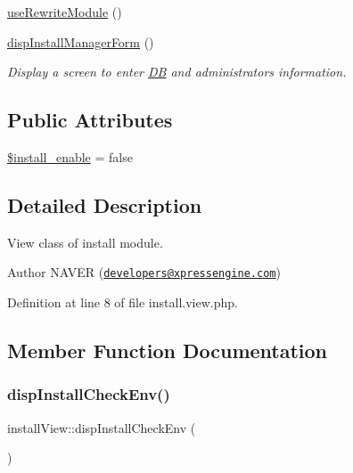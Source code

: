 \begin{DoxyCompactItemize}
\hyperlink{classinstallView_a276997dd4c77a1a1cec5ceed56367ee9}{use\+Rewrite\+Module} ()
\item 
\hyperlink{classinstallView_a00758f2134453587a409e8e8f3e4fada}{disp\+Install\+Manager\+Form} ()
\begin{DoxyCompactList}\small\item\em Display a screen to enter \hyperlink{classDB}{DB} and administrator\textquotesingle{}s information. \end{DoxyCompactList}\end{DoxyCompactItemize}
\subsection*{Public Attributes}
\begin{DoxyCompactItemize}
\item 
\hyperlink{classinstallView_af8e64ea4a91e88a6539bef37e73d3a05}{\$install\+\_\+enable} = false
\end{DoxyCompactItemize}


\subsection{Detailed Description}
View class of install module. 

\begin{DoxyAuthor}{Author}
N\+A\+V\+ER (\href{mailto:developers@xpressengine.com}{\tt developers@xpressengine.\+com}) 
\end{DoxyAuthor}


Definition at line 8 of file install.\+view.\+php.



\subsection{Member Function Documentation}
\mbox{\label{classinstallView_ac73107933a9a9498aaef04380137794d}} 
\subsubsection{\texorpdfstring{disp\+Install\+Check\+Env()}{dispInstallCheckEnv()}}
{\footnotesize\ttfamily install\+View\+::disp\+Install\+Check\+Env (\begin{DoxyParamCaption}{ }\end{DoxyParamCaption})}



